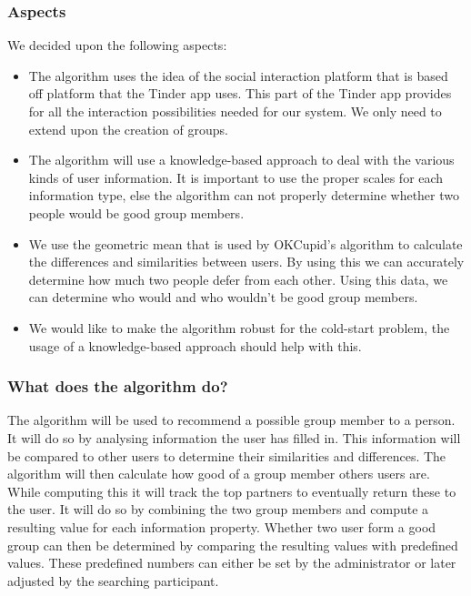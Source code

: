 \subsubsection*{Aspects}
We decided upon the following aspects:
\begin{itemize}
\item The algorithm uses the idea of the social interaction platform that is based off platform that the Tinder app uses.
This part of the Tinder app provides for all the interaction possibilities needed for our system.
We only need to extend upon the creation of groups.
\item The algorithm will use a knowledge-based approach to deal with the various kinds of user information.
It is important to use the proper scales for each information type, else the algorithm can not properly determine whether two people would be good group members.
\item We use the geometric mean that is used by OKCupid's algorithm to calculate the differences and similarities between users.
By using this we can accurately determine how much two people defer from each other.
Using this data, we can determine who would and who wouldn't be good group members.
\item We would like to make the algorithm robust for the cold-start problem, the usage of a knowledge-based approach should help with this.
\end{itemize}

\subsubsection*{What does the algorithm do?}
The algorithm will be used to recommend a possible group member to a person.
It will do so by analysing information the user has filled in.
This information will be compared to other users to determine their similarities and differences.
The algorithm will then calculate how good of a group member others users are.
While computing this it will track the top partners to eventually return these to the user.
It will do so by combining the two group members and compute a resulting value for each information property.
Whether two user form a good group can then be determined by comparing the resulting values with predefined values.
These predefined numbers can either be set by the administrator or later adjusted by the searching participant.

